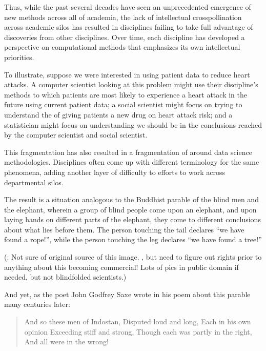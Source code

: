 \documentclass[letterpaper,10pt,english]{jupyterBook}
\begin{document}
\sphinxAtStartPar
Thus, while the past several decades have seen an unprecedented emergence of new methods across all of academia, the lack of intellectual cross\sphinxhyphen{}pollination across academic silos has resulted in disciplines failing to take full advantage of discoveries from other disciplines. Over time, each discipline has developed a perspective on computational methods that emphasizes its own intellectual priorities.

\sphinxAtStartPar
To illustrate, suppose we were interested in using patient data to reduce heart attacks. A computer scientist looking at this problem might use their discipline’s methods to  which patients are most likely to experience a heart attack in the future using current patient data; a social scientist might focus on trying to understand the  of giving patients a new drug on heart attack risk; and a statistician might focus on understanding  we should be in the conclusions reached by the computer scientist and social scientist.

\sphinxAtStartPar
This fragmentation has also resulted in a fragmentation of  around data science methodologies. Disciplines often come up with different terminology for the same phenomena, adding another layer of difficulty to efforts to work across departmental silos.

\sphinxAtStartPar
The result is a situation analogous to the Buddhist parable of the blind men and the elephant, wherein a group of blind people come upon an elephant, and upon laying hands on different parts of the elephant, they come to different conclusions about what lies before them. The person touching the tail declares “we have found a rope!”, while the person touching the leg declares “we have found a tree!”

\sphinxAtStartPar
{}

\sphinxAtStartPar
(: Not sure of original source of this image. , but need to figure out rights prior to anything about this becoming commercial! Lots of pics in public domain if needed, but not blindfolded scientists.)

\sphinxAtStartPar
And yet, as the poet John Godfrey Saxe wrote in his poem  about this parable many centuries later:
\begin{quote}

\sphinxAtStartPar
And so these men of Indostan,
Disputed loud and long,
Each in his own opinion
Exceeding stiff and strong,
Though each was partly in the right,
And all were in the wrong!
\end{quote}
\end{document}
